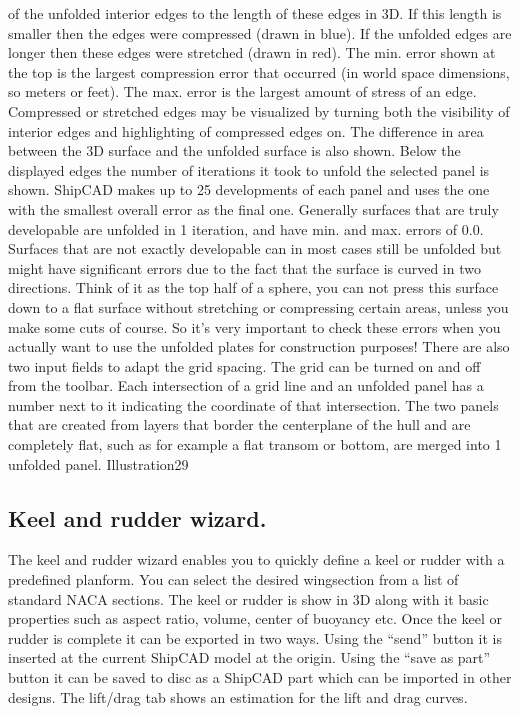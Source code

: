 \documentclass[12pt]{article}
\begin{document}
of the unfolded interior edges to the length of these edges in 3D. If this length is smaller then the
edges were compressed (drawn in blue). If the unfolded edges are longer then these edges were
stretched (drawn in red). The min. error shown at the top is the largest compression error that
occurred (in world space dimensions, so meters or feet). The max. error is the largest amount of
stress of an edge. Compressed or stretched edges may be visualized by turning both the visibility of
interior edges and highlighting of compressed edges on. The difference in area between the 3D
surface and the unfolded surface is also shown. Below the displayed edges the number of iterations
it took to unfold the selected panel is shown. ShipCAD makes up to 25 developments of each
panel and uses the one with the smallest overall error as the final one. Generally surfaces that are
truly developable are unfolded in 1 iteration, and have min. and max. errors of 0.0. Surfaces that are
not exactly developable can in most cases still be unfolded but might have significant errors due to
the fact that the surface is curved in two directions. Think of it as the top half of a sphere, you can
not press this surface down to a flat surface without stretching or compressing certain areas, unless
you make some cuts of course.
So it's very important to check
these errors when you actually
want to use the unfolded plates
for construction purposes!
There are also two input fields to
adapt the grid spacing. The grid
can be turned on and off from the
toolbar. Each intersection of a
grid line and an unfolded panel
has a number next to it indicating
the coordinate of that intersection.
The two panels that are created
from layers that border the
centerplane of the hull and are
completely flat, such as for
example a flat transom or bottom,
are merged into 1 unfolded panel.
Illustration29

\subsection{Keel and rudder wizard.}
The keel and rudder wizard enables you to
quickly define a keel or rudder with a
predefined planform. You can select the
desired wingsection from a list of standard
NACA sections. The keel or rudder is show in
3D along with it basic properties such as
aspect ratio, volume, center of buoyancy etc.
Once the keel or rudder is complete it can be
exported in two ways. Using the “send” button it
is inserted at the current ShipCAD model at
the origin. Using the “save as part” button it can
be saved to disc as a ShipCAD part which
can be imported in other designs. The lift/drag tab shows an estimation for the lift and drag curves.
\end{document}
